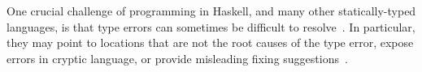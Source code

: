 One crucial challenge of programming in Haskell, and many other statically-typed languages, is that type errors can sometimes be difficult to resolve~\cite{Tirronen2015-nr, Hage2020-hg}. In particular, they may point to locations that are not the root causes of the type error, expose errors in cryptic language, or provide misleading fixing suggestions~\cite{Wu2017-eb}.



